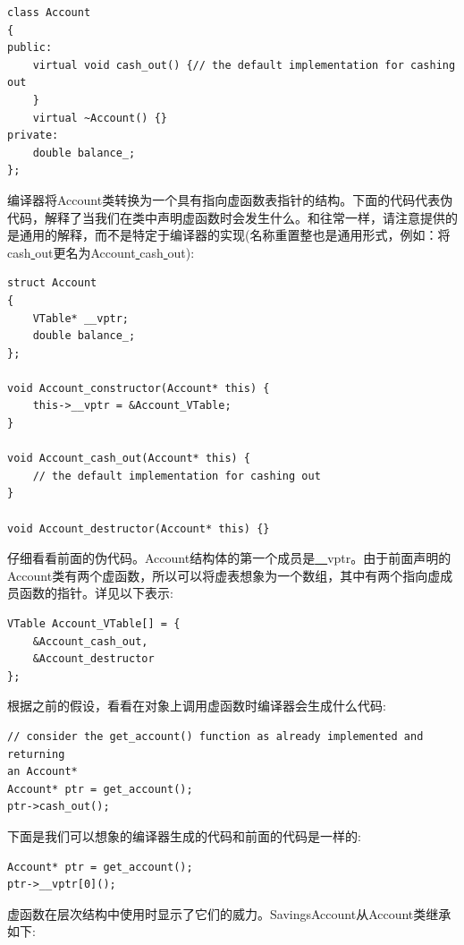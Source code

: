\begin{lstlisting}[caption={}]
class Account
{
public:
	virtual void cash_out() {// the default implementation for cashing out
	}
	virtual ~Account() {}
private:
	double balance_;
};
\end{lstlisting}

编译器将Account类转换为一个具有指向虚函数表指针的结构。下面的代码代表伪代码，解释了当我们在类中声明虚函数时会发生什么。和往常一样，请注意提供的是通用的解释，而不是特定于编译器的实现(名称重置整也是通用形式，例如：将cash\underline{ }out更名为Account\underline{ }cash\underline{ }out): \par

\begin{lstlisting}[caption={}]
struct Account
{
	VTable* __vptr;
	double balance_;
};

void Account_constructor(Account* this) {
	this->__vptr = &Account_VTable;
}

void Account_cash_out(Account* this) {
	// the default implementation for cashing out
}

void Account_destructor(Account* this) {}
\end{lstlisting}

仔细看看前面的伪代码。Account结构体的第一个成员是\underline{~~}vptr。由于前面声明的Account类有两个虚函数，所以可以将虚表想象为一个数组，其中有两个指向虚成员函数的指针。详见以下表示:\par

\begin{lstlisting}[caption={}]
VTable Account_VTable[] = {
	&Account_cash_out,
	&Account_destructor
};
\end{lstlisting}

根据之前的假设，看看在对象上调用虚函数时编译器会生成什么代码: \par

\begin{lstlisting}[caption={}]
// consider the get_account() function as already implemented and returning
an Account*
Account* ptr = get_account();
ptr->cash_out();
\end{lstlisting}

下面是我们可以想象的编译器生成的代码和前面的代码是一样的: \par

\begin{lstlisting}[caption={}]
Account* ptr = get_account();
ptr->__vptr[0]();
\end{lstlisting}

虚函数在层次结构中使用时显示了它们的威力。SavingsAccount从Account类继承如下: \par

